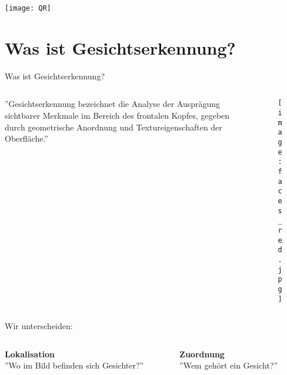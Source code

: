 \documentclass[10pt]{beamer}
\begin{document}
\maketitle


\begin{frame}
  \centering\texttt{[image: QR]}
\end{frame}


\section{Was ist Gesichtserkennung?}

\begin{frame}{Was ist Gesichtserkennung?}

  \begin{columns}
    \begin{column}{.6\textwidth}
      ''Gesichtserkennung bezeichnet die Analyse der Ausprägung sichtbarer Merkmale im Bereich des frontalen Kopfes, gegeben durch geometrische Anordnung und Textureigenschaften der Oberfläche.'' \cite{WikiGesichtserkennung}
    \end{column}
    \begin{column}{.4\textwidth}
      \begin{figure}
        \texttt{[image: faces\_red.jpg]}
      \end{figure}
    \end{column}
  \end{columns}

  \begin{center}
    Wir unterscheiden:
  \end{center}
  \begin{columns}
    \begin{column}{.5\textwidth}
      \begin{center}
        \textbf{Lokalisation}\\
        ''Wo im Bild befinden sich Gesichter?''
      \end{center}
    \end{column}
    \begin{column}{.5\textwidth}
      \begin{center}
        \textbf{Zuordnung}\\
        ''Wem gehört ein Gesicht?''
      \end{center}
    \end{column}
  \end{columns}
\end{frame}
\end{document}
